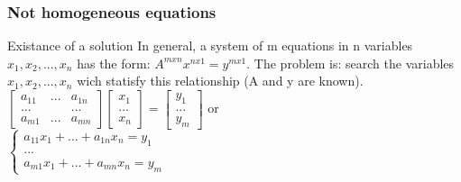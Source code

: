 \begin{frame}
	\frametitle{Not homogeneous equations}
	\begin{block}{Existance of a solution}
		In general, a system of m equations in n variables $x_1,x_2,...,x_n$ has the form: $A^{mxn}x^{nx1}=y^{mx1}$. The problem is: search the variables $x_1,x_2,...,x_n$ wich statisfy this relationship (A and y are known).\\
		$\begin{bmatrix}
		a_{11} & ... & a_{1n}\\
		... & & ...\\
		a_{m1} & ... & a_{mn}
		\end{bmatrix} \begin{bmatrix}
		x_1\\
		...\\
		x_n 
		\end{bmatrix}=\begin{bmatrix} y_1\\...\\y_m\end{bmatrix}$ or\\
		$\begin{cases}
		a_{11}x_1+...+a_{1n}x_n=y_1\\
		...\\
		a_{m1}x_1+...+a_{mn}x_n=y_m
		\end{cases}$\\
	\end{block}
\end{frame}

